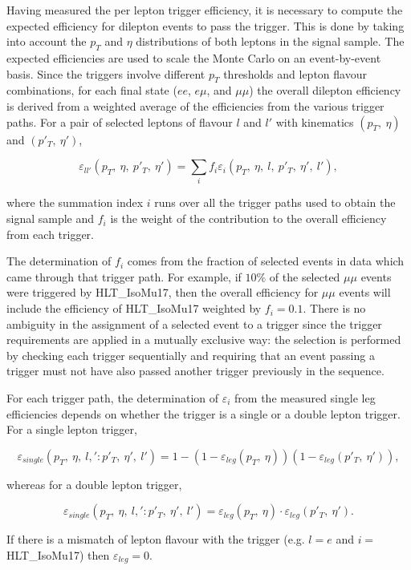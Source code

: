 Having measured the per lepton trigger efficiency,
it is necessary to compute the expected efficiency for dilepton events to pass the trigger.
This is done by taking into account the $p_{T}$ and $\eta$ distributions
of both leptons in the signal sample. The expected efficiencies are used to scale
the Monte Carlo on an event-by-event basis. Since the triggers involve different $p_T$ 
thresholds and lepton flavour combinations, for each final state ($ee$, $e\mu$, and $\mu\mu$)
the overall dilepton efficiency is derived from a weighted average of the 
efficiencies from the various trigger paths. For a pair of selected leptons of flavour $l$ and $l'$
with kinematics $(p_T,\:\eta)$ and $(p'_T,\:\eta')$, 

\begin{equation}
\varepsilon_{ll'}(p_T,\:\eta,\:p'_T,\:\eta') = \sum_i f_i \varepsilon_i(p_T,\:\eta,\:l,\:p'_T,\:\eta',\:l'),
\end{equation}

where the summation index $i$ runs over all the trigger paths used to obtain the signal sample and $f_i$
is the weight of the contribution to the overall efficiency from each trigger.

The determination of $f_i$ comes from the fraction of selected events in data which came 
through that trigger path. For example, if $10\%$ of the selected $\mu\mu$ events were triggered 
by HLT\_IsoMu17, then the overall efficiency for $\mu\mu$ events will include the efficiency 
of HLT\_IsoMu17 weighted by $f_i=0.1$. There is no ambiguity in the assignment of a selected event to
a trigger since the trigger requirements are applied in a mutually exclusive way: the selection is
performed by checking each trigger sequentially and requiring that an event passing a trigger
must not have also passed another trigger previously in the sequence.

For each trigger path, the determination of $\varepsilon_i$ from the measured single leg efficiencies depends
on whether the trigger is a single or a double lepton trigger. For a single lepton trigger,

\begin{equation}
\varepsilon_{single}(p_T,\:\eta,\:l,':p'_T,\:\eta',\:l') = 
1 - \left(1-\varepsilon_{leg}(p_T,\:\eta)\right)\left(1-\varepsilon_{leg}(p'_T,\:\eta')\right),
\end{equation}

whereas for a double lepton trigger,

\begin{equation}
\varepsilon_{single}(p_T,\:\eta,\:l,':p'_T,\:\eta',\:l') = \varepsilon_{leg}(p_T,\:\eta)\cdot\varepsilon_{leg}(p'_T,\:\eta').
\end{equation}

If there is a mismatch of lepton flavour with the trigger (e.g. $l=e$ and $i=$HLT\_IsoMu17) then $\varepsilon_{leg}=0$.
